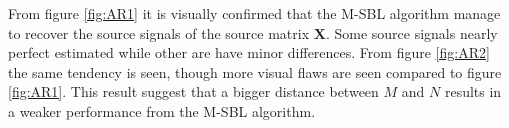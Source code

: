 \noindent
From figure \ref{fig:AR1} it is visually confirmed that the M-SBL algorithm manage to recover the source signals of the source matrix $\mathbf{X}$. 
Some source signals nearly perfect estimated while other are have minor differences. 
From figure \ref{fig:AR2} the same tendency is seen, though more visual flaws are seen compared to figure \ref{fig:AR1}. 
This result suggest that a bigger distance between $M$ and $N$ results in a weaker performance from the M-SBL algorithm.        

% 






 
